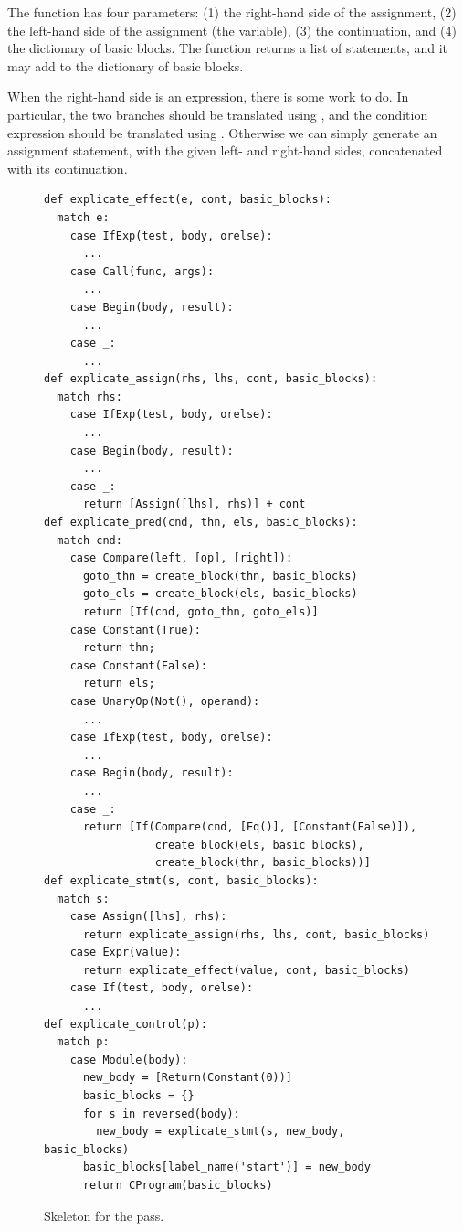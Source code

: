 \documentclass[7x10]{TimesAPriori_MIT}%
\numberwithin{theorem}{chapter}
\numberwithin{definition}{chapter}
\numberwithin{equation}{chapter}
\begin{document}
{The  function has four parameters: (1) the
right-hand side of the assignment, (2) the left-hand side of the
assignment (the variable), (3) the continuation, and (4) the dictionary
of basic blocks. The  function returns a list
of \LangCIf{} statements, and it may add to the dictionary of basic
blocks.

When the right-hand side is an  expression, there is some
work to do. In particular, the two branches should be translated using
, and the condition expression should be
translated using .  Otherwise we can simply
generate an assignment statement, with the given left- and right-hand
sides, concatenated with its continuation.

\begin{figure}[tbp]
\begin{tcolorbox}[colback=white]
\begin{lstlisting}[basicstyle=\ttfamily\footnotesize]
def explicate_effect(e, cont, basic_blocks):
  match e:
    case IfExp(test, body, orelse):
      ...
    case Call(func, args):
      ...
    case Begin(body, result):
      ...
    case _:
      ...
def explicate_assign(rhs, lhs, cont, basic_blocks):
  match rhs:
    case IfExp(test, body, orelse):
      ...
    case Begin(body, result):
      ...
    case _:
      return [Assign([lhs], rhs)] + cont
def explicate_pred(cnd, thn, els, basic_blocks):
  match cnd:
    case Compare(left, [op], [right]):
      goto_thn = create_block(thn, basic_blocks)
      goto_els = create_block(els, basic_blocks)
      return [If(cnd, goto_thn, goto_els)]
    case Constant(True):
      return thn;
    case Constant(False):
      return els;
    case UnaryOp(Not(), operand):
      ...
    case IfExp(test, body, orelse):
      ...
    case Begin(body, result):
      ...
    case _:
      return [If(Compare(cnd, [Eq()], [Constant(False)]),
                 create_block(els, basic_blocks),
                 create_block(thn, basic_blocks))]
def explicate_stmt(s, cont, basic_blocks):
  match s:
    case Assign([lhs], rhs):
      return explicate_assign(rhs, lhs, cont, basic_blocks)
    case Expr(value):
      return explicate_effect(value, cont, basic_blocks)
    case If(test, body, orelse):
      ...
def explicate_control(p):
  match p:
    case Module(body):
      new_body = [Return(Constant(0))]
      basic_blocks = {}
      for s in reversed(body):
        new_body = explicate_stmt(s, new_body, basic_blocks)
      basic_blocks[label_name('start')] = new_body
      return CProgram(basic_blocks)
\end{lstlisting}
\end{tcolorbox}
\caption{Skeleton for the  pass.}
\label{fig:explicate-control-Lif}
\end{figure}
\fi}
\end{document}
